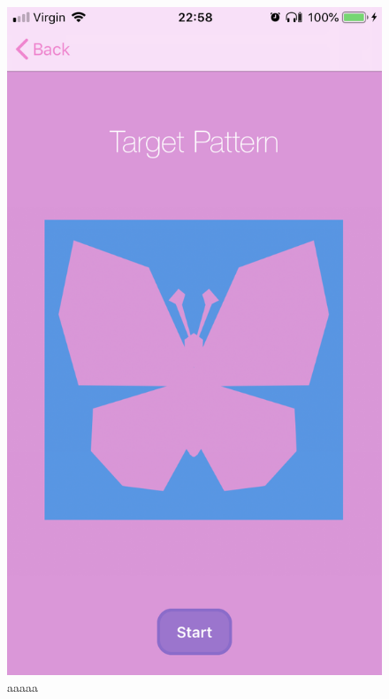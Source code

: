 \documentclass[11pt]{article}
\begin{document}
            \paragraph{}
            \begin{figure}[!ht]
                        \begin{minipage}{0.45\textwidth}
                            \centering \includegraphics[width=0.7\linewidth]{KiriZen/simpleTarget.png}
                            \caption{aaaaa}
                            \label{fig:kiriZen-simpleTarget}
                        \end{minipage}\hfill
                        \begin{minipage}{0.45\textwidth}
                            \centering

\end{minipage}
\end{figure}
\end{document}
